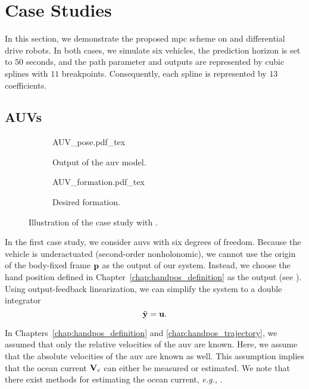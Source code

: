 \section{Case Studies}
\label{sec:MPC_case_studies}


In this section, we demonstrate the proposed \gls{mpc} scheme on  and differential drive robots.
In both cases, we simulate six vehicles, the prediction horizon is set to $50$ seconds, and the path parameter and outputs are represented by cubic splines with $11$ breakpoints.
Consequently, each spline is represented by $13$ coefficients.

\subsection{AUVs}
\label{sec:MPC_case_study_AUV}

\begin{figure}[b]
    \centering
    \begin{subfigure}[t]{0.35\textwidth}
        \centering
        \def\svgwidth{\textwidth}
        {AUV_pose.pdf_tex}
        \caption{Output of the \gls{auv} model.}
        \label{fig:MPC_AUV_pose}        
    \end{subfigure}
    \hspace*{0.15\textwidth}
    \begin{subfigure}[t]{0.35\textwidth}
        \centering
        \def\svgwidth{\textwidth}
        {AUV_formation.pdf_tex}
        \caption{Desired formation.}
        \label{fig:MPC_AUV_formation}
    \end{subfigure}
    \caption{Illustration of the case study with .}
\end{figure}

In the first case study, we consider \glspl{auv} with six degrees of freedom.
Because the vehicle is underactuated (second-order nonholonomic), we cannot use the origin of the body-fixed frame $\mathbf{p}$ as the output of our system.
Instead, we choose the hand position defined in Chapter~\ref{chap:handpos_definition} as the output (see ).
Using output-feedback linearization, we can simplify the system to a double integrator 
\begin{equation}
    \ddot{\mathbf{y}} = \mathbf{u}. 
\end{equation}

\begin{rmk*}
    In Chapters~\ref{chap:handpos_definition} and \ref{chap:handpos_trajectory}, we assumed that only the relative velocities of the \gls{auv} are known.
    Here, we assume that the absolute velocities of the \gls{auv} are known as well.
    This assumption implies that the ocean current $\mathbf{V}_c$ can either be measured or estimated.
    We note that there exist methods for estimating the ocean current, \emph{e.g.,} \cite{zhu_kalman_2016}.
\end{rmk*}

